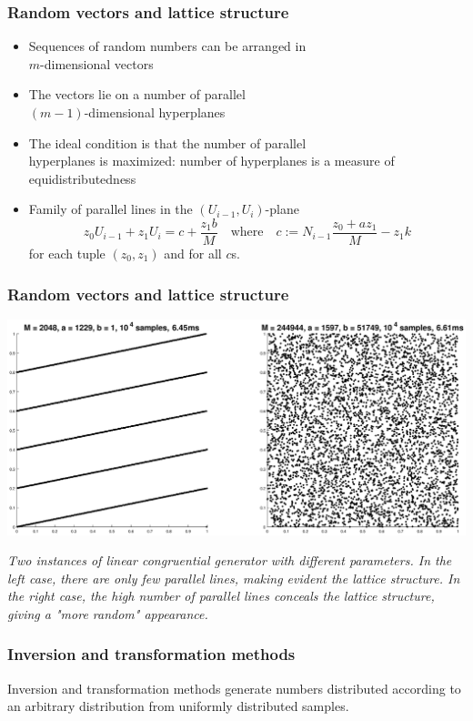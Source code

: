 \documentclass[10pt, serif, mathserif]{beamer}
\begin{document}
\begin{frame}
  \frametitle{Random vectors and lattice structure}
  \begin{itemize}
  	\item Sequences of random numbers can be arranged in \\ $m$-dimensional vectors
  	\item The vectors lie on a number of parallel \\ $(m-1)$-dimensional hyperplanes
  	\item The ideal condition is that the number of parallel \\ hyperplanes is maximized:
  	  number of hyperplanes is a measure of equidistributedness
  	\item Family of parallel lines in the $(U_{i-1},U_i)$-plane \[
  		z_0 U_{i-1} +z_1 U_i = c + \frac{z_1 b}{M} \quad \text{where} \quad c := N_{i-1}\frac{z_0 + az_1}{M} - z_1 k
  	  \] for each tuple $(z_0,z_1)$ and for all $c$s.
  \end{itemize}
\end{frame}

\begin{frame}
  \frametitle{Random vectors and lattice structure}
  \vspace{1.5cm}
  \centering\includegraphics[width=.9\textwidth,trim=60mm 60mm 60mm 60mm]{../lcg.eps}

  \vspace{1cm}
  \emph{\scriptsize Two instances of linear congruential generator with different parameters. In the left case,
  there are only few parallel lines, making evident the lattice structure. In the right case,
  the high number of parallel lines conceals the lattice structure, giving a "more random" appearance.}
\end{frame}

\begin{frame}
  \frametitle{Inversion and transformation methods}
  \begin{itemize}
  	Inversion and transformation methods generate numbers distributed according to
  	an arbitrary distribution from uniformly distributed samples.
  \end{itemize}
\end{frame}
\end{document}
